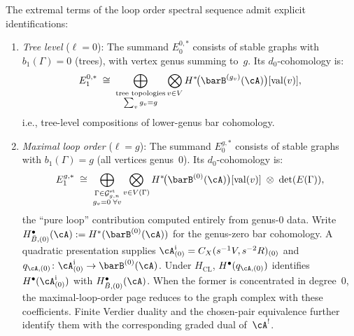 \begin{proposition}\label{prop:extremal-pages}
The extremal terms of the loop order spectral sequence admit
explicit identifications:
\begin{enumerate}[label=\textup{(\alph*)}]
\item \emph{Tree level} \textup{(}$\ell = 0$\textup{):}
 The summand $E_0^{0,*}$ consists of stable graphs with
 $b_1(\Gamma) = 0$ \textup{(}trees\textup{)}, with vertex genus
 summing to~$g$. Its $d_0$-cohomology is:
 \begin{equation}\label{eq:tree-level-page}
 E_1^{0,*}
 \;\cong\;
 \bigoplus_{\substack{
 \text{tree topologies}\\
 \sum_v g_v = g}}
 \bigotimes_{v \in V}
 H^*\!\bigl(\barB^{(g_v)}(\cA)\bigr)[\mathrm{val}(v)],
 \end{equation}
 i.e., tree-level compositions of lower-genus bar cohomology.

\item \emph{Maximal loop order} \textup{(}$\ell = g$\textup{):}
 The summand $E_0^{g,*}$ consists of stable graphs with
 $b_1(\Gamma) = g$ \textup{(}all vertices genus~$0$\textup{)}.
 Its $d_0$-cohomology is:
 \begin{equation}\label{eq:max-loop-page}
 E_1^{g,*}
 \;\cong\;
 \bigoplus_{\substack{
 \Gamma \in \mathcal{G}_{g,n}^{\mathrm{st}}\\
 g_v = 0 \;\forall v}}
 \bigotimes_{v \in V(\Gamma)}
 H^*\!\bigl(\barB^{(0)}(\cA)\bigr)[\mathrm{val}(v)]
 \;\otimes\;
 \det(E(\Gamma)),
 \end{equation}
 the ``pure loop'' contribution computed entirely from genus-$0$
 data. Write
 $H^\bullet_{\bar B,(0)}(\cA):=H^*(\barB^{(0)}(\cA))$ for the
 genus-zero bar cohomology.  A quadratic presentation supplies
 $\cA^{\mathrm i}_{(0)}=C_X(s^{-1}V,s^{-2}R)_{(0)}$ and
 $q_{\cA,(0)}\colon\cA^{\mathrm i}_{(0)}\to\barB^{(0)}(\cA)$.
 Under $H_{\mathrm{CL}}$, $H^\bullet(q_{\cA,(0)})$ identifies
 $H^\bullet(\cA^{\mathrm i}_{(0)})$ with
 $H^\bullet_{\bar B,(0)}(\cA)$.  When the former is concentrated in
 degree~$0$, the maximal-loop-order page reduces to the graph complex
 with these coefficients.  Finite Verdier duality and the chosen-pair
 equivalence further identify them with the corresponding graded
 dual of~$\cA^!$.
\end{enumerate}
\end{proposition}

